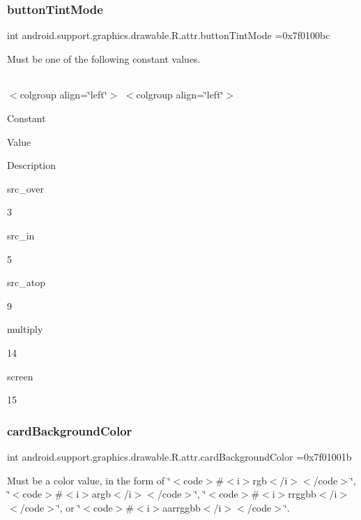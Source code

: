 \subsubsection{\texorpdfstring{button\+Tint\+Mode}{buttonTintMode}}
{\footnotesize\ttfamily int android.\+support.\+graphics.\+drawable.\+R.\+attr.\+button\+Tint\+Mode =0x7f0100bc\hspace{0.3cm}{\ttfamily [static]}}

Must be one of the following constant values.

\tabulinesep=1mm
\begin{longtabu} spread 0pt [c]{*{0}{|X[-1]}|}
\hline
\end{longtabu}
$<$colgroup align=\char`\"{}left\char`\"{}$>$ $<$colgroup align=\char`\"{}left\char`\"{}$>$ 

Constant

Value

Description 

{\ttfamily src\+\_\+over}

3

{\ttfamily src\+\_\+in}

5

{\ttfamily src\+\_\+atop}

9

{\ttfamily multiply}

14

{\ttfamily screen}

15\mbox{\label{classandroid_1_1support_1_1graphics_1_1drawable_1_1R_1_1attr_a9d3f952b0186315e98fb7a516381df4d}} 
\subsubsection{\texorpdfstring{card\+Background\+Color}{cardBackgroundColor}}
{\footnotesize\ttfamily int android.\+support.\+graphics.\+drawable.\+R.\+attr.\+card\+Background\+Color =0x7f01001b\hspace{0.3cm}{\ttfamily [static]}}

Must be a color value, in the form of \char`\"{}$<$code$>$\#$<$i$>$rgb$<$/i$>$$<$/code$>$\char`\"{}, \char`\"{}$<$code$>$\#$<$i$>$argb$<$/i$>$$<$/code$>$\char`\"{}, \char`\"{}$<$code$>$\#$<$i$>$rrggbb$<$/i$>$$<$/code$>$\char`\"{}, or \char`\"{}$<$code$>$\#$<$i$>$aarrggbb$<$/i$>$$<$/code$>$\char`\"{}. 

